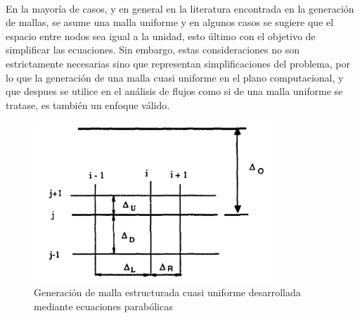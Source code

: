 \documentclass[letterpaper, openright, 12pt]{book}
\begin{document}
    \paragraph*{}
    En la mayoría de casos, y en general en la literatura encontrada en la
    generación de mallas, se asume una malla uniforme y en algunos casos se
    sugiere que el espacio entre nodos sea igual a la unidad, esto último
    con el objetivo de simplificar las ecuaciones. Sin embargo, estas
    consideraciones no son estrictamente necesarias sino que representan
    simplificaciones del problema, por lo que la generación de una malla
    cuasi uniforme en el plano computacional, y que despues se utilice en el
    análisis de flujos como si de una malla uniforme se tratase, es también
    un enfoque válido.
    \begin{figure}[htbp!]
        \centering
        \includegraphics[keepaspectratio, width=0.8\textwidth]{./img/parabolic_non_uniform.png}
        \caption[Generación de malla cuasi uniforme por ecuaciones
        parabólicas]{Generación de malla estructurada cuasi uniforme
        desarrollada mediante ecuaciones parabólicas \cite{siladicParabolic}}
        \label{fig:parabolic_non_uniform}
    \end{figure}
\end{document}
